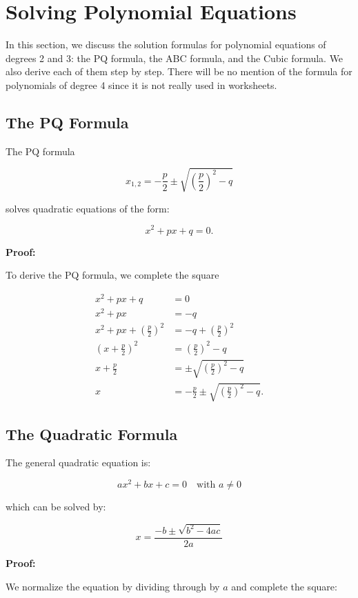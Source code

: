 \chapter{Solving Polynomial Equations}

In this section, we discuss the solution formulas for polynomial equations of degrees 2 and 3: the PQ 
formula, the ABC formula, and the Cubic formula. We also derive each of them step by step. There 
will be no mention of the formula for polynomials of degree 4 since it is not really used in worksheets.

\section{The PQ Formula}

The PQ formula 

\[
    x_{1, 2} = -\frac{p}{2} \pm \sqrt{{\left(\frac{p}{2}\right)}^2 - q}
\]

solves quadratic equations of the form:

\[
    x^2 + px + q = 0.
\]

\textbf{Proof:}

To derive the PQ formula, we complete the square

\begin{align*}
    x^2 + px + q &= 0 \\
    x^2 + px &= -q \\
    x^2 + px + {\left(\frac{p}{2}\right)}^2 &= -q + {\left(\frac{p}{2}\right)}^2 \\
    {\left(x + \frac{p}{2}\right)}^2 &= {\left(\frac{p}{2}\right)}^2 - q \\
    x + \frac{p}{2} &= \pm \sqrt{{\left(\frac{p}{2}\right)}^2 - q} \\
    x &= -\frac{p}{2} \pm \sqrt{{\left(\frac{p}{2}\right)}^2 - q}.
\end{align*}

\section{The Quadratic Formula}

The general quadratic equation is:

\[
    ax^2 + bx + c = 0 \quad\text{with } a \ne 0
\]

which can be solved by: 

\[
    x = \frac{-b \pm \sqrt{b^2 - 4ac}}{2a}
\]

\textbf{Proof:}

We normalize the equation by dividing through by \(a\) and complete the square:

